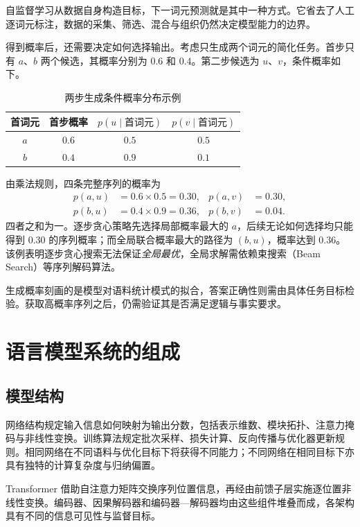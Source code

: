 \documentclass[../textbook.tex]{subfiles}
\begin{document}
自监督学习从数据自身构造目标，下一词元预测就是其中一种方式。它省去了人工逐词元标注，数据的采集、筛选、混合与组织仍然决定模型能力的边界。

\begin{example}[局部决策与序列决策]
得到概率后，还需要决定如何选择输出。考虑只生成两个词元的简化任务。首步只有 $a$、$b$ 两个候选，其概率分别为 $0.6$ 和 $0.4$。第二步候选为 $u$、$v$，条件概率如下。
\begin{table}[htbp]
\centering
\caption{两步生成条件概率分布示例}
\label{tab:intro-two-step-example}
\begin{tabular}{cccc}
\toprule 首词元 & 首步概率 & $p(u\mid\text{首词元})$ & $p(v\mid\text{首词元})$\\\midrule
$a$ & $0.6$ & $0.5$ & $0.5$\\
$b$ & $0.4$ & $0.9$ & $0.1$\\\bottomrule
\end{tabular}
\end{table}
由乘法规则，四条完整序列的概率为
\begin{align*}
 p(a,u)&=0.6\times0.5=0.30,&p(a,v)&=0.30,\\
 p(b,u)&=0.4\times0.9=0.36,&p(b,v)&=0.04.
\end{align*}
四者之和为一。逐步贪心策略先选择局部概率最大的 $a$，后续无论如何选择均只能得到 $0.30$ 的序列概率；而全局联合概率最大的路径为 $(b,u)$，概率达到 $0.36$。该例表明逐步贪心搜索无法保证\emph{全局最优}，全局求解需依赖束搜索（Beam Search）等序列解码算法。

生成概率刻画的是模型对语料统计模式的拟合，答案正确性则需由具体任务目标检验。获取高概率序列之后，仍需验证其是否满足逻辑与事实要求。
\end{example}

\section{语言模型系统的组成}

\subsection{模型结构}
网络结构规定输入信息如何映射为输出分数，包括表示维数、模块拓扑、注意力掩码与非线性变换。训练算法规定批次采样、损失计算、反向传播与优化器更新规则。相同网络在不同语料与优化目标下将获得不同能力；不同网络在相同目标下亦具有独特的计算复杂度与归纳偏置。

Transformer 借助自注意力矩阵交换序列位置信息，再经由前馈子层实施逐位置非线性变换。编码器、因果解码器和编码器—解码器均由这些组件堆叠而成，各架构具有不同的信息可见性与监督目标。
\end{document}
